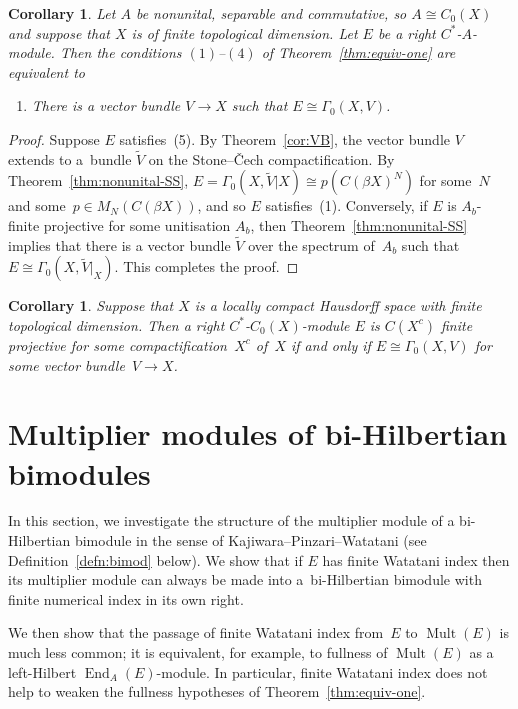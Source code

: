 \documentclass[pdftex]{sigma}
\numberwithin{equation}{section}
\newtheorem{corl}[thm]{Corollary}
 { \theoremstyle{definition}
\newtheorem{defn}[thm]{Definition}
\newtheorem{Example}[thm]{Example}
\newtheorem{rmk}[thm]{Remark}}
\DeclareMathOperator{\End}{End} %
\DeclareMathOperator{\Mult}{Mult} %
\begin{document}
\begin{corl}\label{thm:equiv-two} Let $A$ be nonunital, separable and commutative, so $A\cong C_0(X)$ and suppose that $X$ is of finite topological dimension. Let $E$ be a right $C^*$-$A$-module. Then the conditions $(1)$--$(4)$ of Theorem~{\rm \ref{thm:equiv-one}} are equivalent to
\begin{enumerate}\itemsep=0pt
\item[$5.$] There is a vector bundle $V\to X$ such that $E\cong \Gamma_0(X,V)$.
\end{enumerate}
\end{corl}

\begin{proof}
Suppose $E$ satisf\/ies~(5). By Theorem~\ref{cor:VB}, the vector bundle $V$ extends to a~bundle $\tilde{V}$ on the Stone--\v{C}ech compactif\/ication. By Theorem~\ref{thm:nonunital-SS}, $E=\Gamma_0(X,\tilde{V}|X)\cong p(C(\beta X)^N)$ for some~$N$ and some~$p\in M_N(C(\beta X))$, and so $E$ satisf\/ies~(1). Conversely, if $E$ is $A_b$-f\/inite projective for some unitisation $A_b$, then Theorem~\ref{thm:nonunital-SS} implies that there is a vector bundle $\tilde{V}$ over the spectrum of~$A_b$ such that $E\cong \Gamma_0(X,\tilde{V}|_X)$. This completes the proof.
\end{proof}

\begin{corl} Suppose that $X$ is a locally compact Hausdorff space with finite topological dimension. Then a right $C^*$-$C_0(X)$-module $E$ is $C(X^c)$ finite projective for some compactification~$X^c$ of~$X$ if and only if $E\cong\Gamma_0(X,V)$ for some vector bundle~$V\to X$.
\end{corl}

\section{Multiplier modules of bi-Hilbertian bimodules}

In this section, we investigate the structure of the multiplier module of a bi-Hilbertian bimodule in the sense of Kajiwara--Pinzari--Watatani (see Def\/inition~\ref{defn:bimod} below). We show that if $E$ has f\/inite Watatani index then its multiplier module can always be made into a~bi-Hilbertian bimodule with f\/inite numerical index in its own right.

We then show that the passage of f\/inite Watatani index from~$E$ to $\Mult(E)$ is much less common; it is equivalent, for example, to fullness of $\Mult(E)$ as a left-Hilbert $\End_{A}(E)$-module. In particular, f\/inite Watatani index does not help to weaken the fullness hypotheses of Theorem~\ref{thm:equiv-one}.
\end{document}
